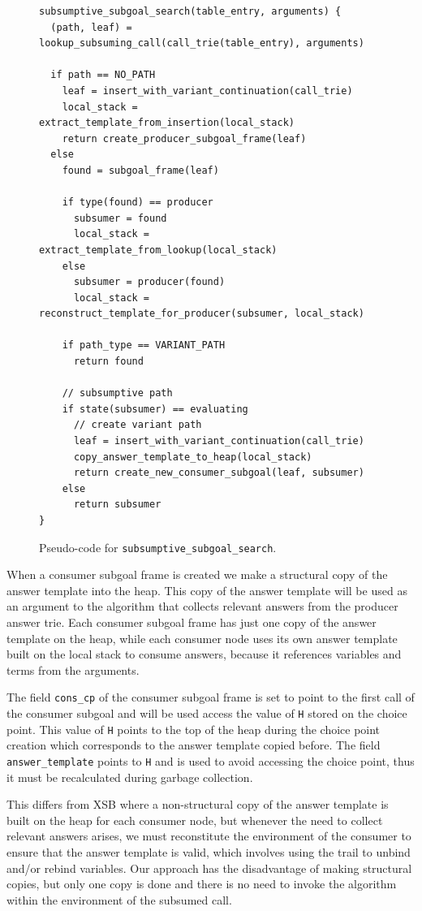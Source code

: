 \begin{figure}[ht]
\begin{Verbatim}
subsumptive_subgoal_search(table_entry, arguments) {
  (path, leaf) = lookup_subsuming_call(call_trie(table_entry), arguments)
  
  if path == NO_PATH
    leaf = insert_with_variant_continuation(call_trie)
    local_stack = extract_template_from_insertion(local_stack)
    return create_producer_subgoal_frame(leaf)
  else
    found = subgoal_frame(leaf)
    
    if type(found) == producer
      subsumer = found
      local_stack = extract_template_from_lookup(local_stack)
    else
      subsumer = producer(found)
      local_stack = reconstruct_template_for_producer(subsumer, local_stack)
    
    if path_type == VARIANT_PATH
      return found
    
    // subsumptive path
    if state(subsumer) == evaluating
      // create variant path
      leaf = insert_with_variant_continuation(call_trie)
      copy_answer_template_to_heap(local_stack)
      return create_new_consumer_subgoal(leaf, subsumer)
    else
      return subsumer
}
\end{Verbatim}
\caption{Pseudo-code for \texttt{subsumptive\_subgoal\_search}.}
\label{fig:subsumptive_subgoal_search}
\end{figure}

When a consumer subgoal frame is created we make a structural copy of the answer template
into the heap. This copy of the answer template will be used as an argument
to the algorithm that collects relevant answers from the producer answer trie.
Each consumer subgoal frame has just one copy of the answer template on the heap,
while each consumer node uses its own answer template built on the local stack to
consume answers, because it references variables
and terms from the arguments.

The field \texttt{cons\_cp} of the consumer subgoal frame is set to point to the first call
of the consumer subgoal and will be used access the value of \texttt{H} stored on the choice point.
This value of \texttt{H} points to the top of the heap during the choice point creation which corresponds
to the answer template copied before. The field \texttt{answer\_template} points to \texttt{H}
and is used to avoid accessing the choice point, thus it must be recalculated during garbage collection.

This differs from XSB \cite{XXX} where a non-structural copy of the answer template is built on the heap for each
consumer node, but whenever the need to collect relevant answers arises, we must reconstitute the
environment of the consumer to ensure that the answer template is valid, which involves using the trail
to unbind and/or rebind variables. Our approach has the disadvantage of making structural copies,
but only one copy is done and there is no need to invoke the algorithm
within the environment of the subsumed call.

